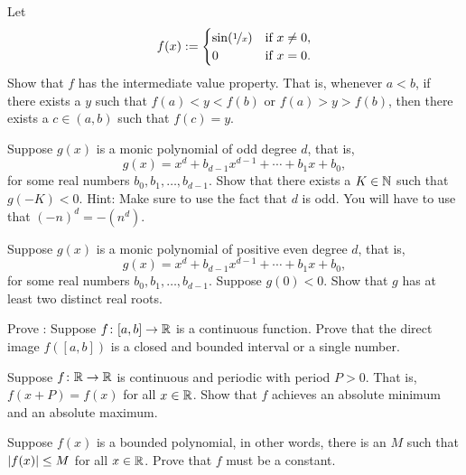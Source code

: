 \begin{exercise} \label{exercise:meanvaluepropsin1x}
Let
\begin{equation*}
f(x) :=
\begin{cases}
\sin(\nicefrac{1}{x}) & \text{if } x \not= 0, \\
0 & \text{if } x=0.
\end{cases}
\end{equation*}
Show that $f$ has the intermediate value property.
That is, whenever $a < b$, if there exists a $y$ such that $f(a) < y < f(b)$
or $f(a) > y > f(b)$, then
there exists a $c \in (a,b)$ such that $f(c) = y$.
\end{exercise}

\begin{exercise} \label{exercise:odddegnegativeK}
Suppose $g(x)$ is a monic polynomial of odd degree $d$, that is,
\begin{equation*}
g(x) = x^d + b_{d-1} x^{d-1} + \cdots + b_1 x + b_0 ,
\end{equation*}
for some real numbers $b_{0}, b_1, \ldots, b_{d-1}$.  Show that there exists
a $K \in {\mathbb{N}}$ such that $g(-K) < 0$.  Hint: Make sure to use the fact that
$d$ is odd.  You will have to use that ${(-n)}^d = -(n^d)$.
\end{exercise}

\begin{exercise}
Suppose $g(x)$ is a monic polynomial of positive even degree $d$, that is,
\begin{equation*}
g(x) = x^d + b_{d-1} x^{d-1} + \cdots + b_1 x + b_0 ,
\end{equation*}
for some real numbers $b_{0}, b_1, \ldots, b_{d-1}$.  Suppose 
$g(0) < 0$.  Show that $g$ has at least two distinct real roots.
\end{exercise}

\begin{exercise}
Prove :
Suppose $f \colon [a,b] \to {\mathbb{R}}$ is a continuous function.  Prove
that the direct image $f([a,b])$ is a closed and bounded interval or
a single number.
\end{exercise}

\begin{exercise}
Suppose $f \colon {\mathbb{R}} \to {\mathbb{R}}$ is continuous and periodic with period
$P > 0$.  That is, $f(x+P) = f(x)$ for all $x \in {\mathbb{R}}$.  Show that $f$
achieves an absolute minimum and an absolute maximum.
\end{exercise}

\begin{exercise}[Challenging]
Suppose $f(x)$ is a bounded polynomial,
in other words, there is an $M$ such that $\left\lvert {f(x)} \right\rvert \leq M$
for all $x \in {\mathbb{R}}$.  Prove that $f$ must be a constant.
\end{exercise}

